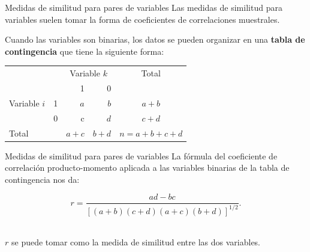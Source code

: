 \documentclass[spanish]{beamer}
\begin{document}
\begin{frame}{Medidas de similitud para pares de variables}
Las medidas de similitud para variables suelen tomar la forma de coeficientes de correlaciones muestrales.\break

Cuando las variables son binarias, los datos se pueden organizar en una \textbf{tabla de contingencia} que tiene la siguiente forma:

\begin{table}[h]
  \centering
\resizebox{7.5cm}{!} {
\begin{tabular}{llrrrr}
\multicolumn{2}{l}{\multirow{}{}{}} & \multicolumn{2}{c}{Variable $k$} & \multicolumn{2}{c}{\multirow{}{}{Total}} \\\cmidrule{3-4}
\multicolumn{2}{l}{}                  & 1             & 0       & \multicolumn{2}{c}{}                        \\ \hline
\multirow{}{}{Variable $i$}       & 1      & $a$          & $b$       & \multicolumn{2}{c}{$a+b$}                     \\
                              & 0      & c            & $d$       & \multicolumn{2}{c}{$c+d$}                     \\ \hline
\multicolumn{2}{l}{Total}            & $a+c$          & $b+d$     & \multicolumn{2}{c}{$n=a+b+c+d$}\\
\bottomrule            
\end{tabular}
}
\end{table}
\end{frame}

\begin{frame}{Medidas de similitud para pares de variables}
La fórmula del coeficiente de correlación producto-momento aplicada a las variables binarias de la tabla de contingencia nos da:\break

$$r = \frac{ad-bc}{[(a+b)(c+d)(a+c)(b+d)]^{1/2}}.$$\

$r$ se puede tomar como la medida de similitud entre las dos variables.
\end{frame}
\end{document}
